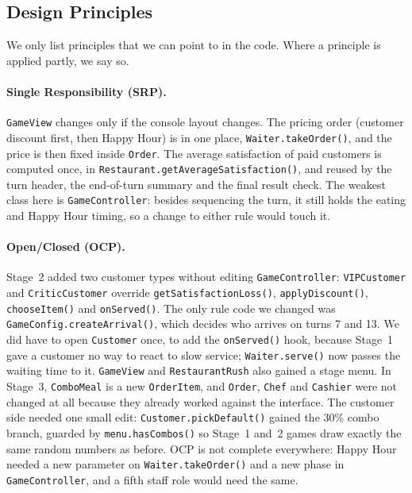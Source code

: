 \subsection{Design Principles}

We only list principles that we can point to in the code. Where a principle is applied partly, we say so.

\paragraph{Single Responsibility (SRP).}
\texttt{GameView} changes only if the console layout changes. The pricing order (customer discount first, then Happy Hour) is in one place, \texttt{Waiter.takeOrder()}, and the price is then fixed inside \texttt{Order}. The average satisfaction of paid customers is computed once, in \texttt{Restaurant.getAverageSatisfaction()}, and reused by the turn header, the end-of-turn summary and the final result check. The weakest class here is \texttt{GameController}: besides sequencing the turn, it still holds the eating and Happy Hour timing, so a change to either rule would touch it.

\paragraph{Open/Closed (OCP).}
Stage~2 added two customer types without editing \texttt{GameController}: \texttt{VIPCustomer} and \texttt{CriticCustomer} override \texttt{getSatisfactionLoss()}, \texttt{applyDiscount()}, \texttt{chooseItem()} and \texttt{onServed()}. The only rule code we changed was \texttt{GameConfig.createArrival()}, which decides who arrives on turns 7 and 13. We did have to open \texttt{Customer} once, to add the \texttt{onServed()} hook, because Stage~1 gave a customer no way to react to slow service; \texttt{Waiter.serve()} now passes the waiting time to it. \texttt{GameView} and \texttt{RestaurantRush} also gained a stage menu. In Stage~3, \texttt{ComboMeal} is a new \texttt{OrderItem}, and \texttt{Order}, \texttt{Chef} and \texttt{Cashier} were not changed at all because they already worked against the interface. The customer side needed one small edit: \texttt{Customer.pickDefault()} gained the 30\% combo branch, guarded by \texttt{menu.hasCombos()} so Stage~1 and~2 games draw exactly the same random numbers as before. OCP is not complete everywhere: Happy Hour needed a new parameter on \texttt{Waiter.takeOrder()} and a new phase in \texttt{GameController}, and a fifth staff role would need the same.

